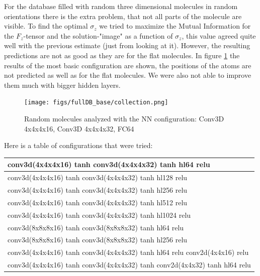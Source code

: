 \documentclass{article}
\begin{document}
For the database filled with random three dimensional molecules in random orientations there is the extra problem, that not all parts of the molecule are visible. To find the optimal $\sigma_z$ we tried to maximize the Mutual Information for the $F_z$-tensor and the solution-"image" as a function of $\sigma_z$, this value agreed quite well with the previous estimate (just from looking at it). However, the resulting predictions are not as good as they are for the flat molecules. In figure \ref{fig:resultsfullDB} the results of the  most basic configuration are shown, the positions of the atoms are not predicted as well as for the flat molecules. We were also not able to improve them much with bigger hidden layers.

\begin{figure}[htbp]
	\begin{center}
		\texttt{[image: figs/fullDB\_base/collection.png]}
		\caption{Random molecules analyzed with the NN configuration: Conv3D 4x4x4x16, Conv3D 4x4x4x32, FC64}
		\label{fig:resultsfullDB}
	\end{center}
\end{figure}

Here is a table of configurations that were tried:

\begin{center}
\begin{tabular}{|l|}
\hline conv3d(4x4x4x16) tanh conv3d(4x4x4x32) tanh hl64 relu \\
\hline conv3d(4x4x4x16) tanh conv3d(4x4x4x32) tanh hl128 relu \\
\hline conv3d(4x4x4x16) tanh conv3d(4x4x4x32) tanh hl256 relu \\
\hline conv3d(4x4x4x16) tanh conv3d(4x4x4x32) tanh hl512 relu \\
\hline conv3d(4x4x4x16) tanh conv3d(4x4x4x32) tanh hl1024 relu \\
\hline conv3d(8x8x8x16) tanh conv3d(8x8x8x32) tanh hl64 relu \\
\hline conv3d(8x8x8x16) tanh conv3d(8x8x8x32) tanh hl256 relu \\
\hline conv3d(4x4x4x16) tanh conv3d(4x4x4x32) tanh hl64 relu conv2d(4x4x16) relu \\
\hline conv3d(4x4x4x16) tanh conv3d(4x4x4x32) tanh conv2d(4x4x32) tanh hl64 relu \\
\hline
\end{tabular}
\end{center}
\\
\end{document}
